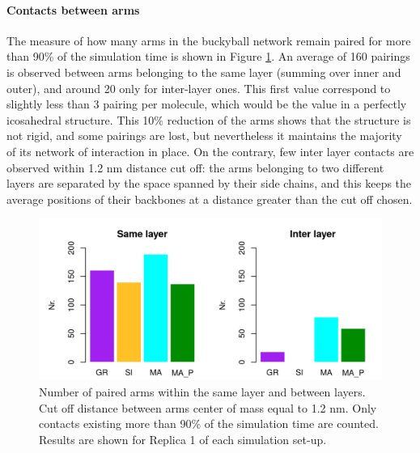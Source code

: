 \paragraph{Contacts between arms} The measure of how many arms in the buckyball network remain paired for more than 90\% of the simulation time is shown in Figure \ref{fig:BTI_beta}. An average of 160 pairings is observed between arms belonging to the same layer (summing over inner and outer), and around 20 only for inter-layer ones.
%
This first value correspond to slightly less than 3 pairing per molecule, which would be the value in a perfectly icosahedral structure. This 10\% reduction of the arms shows that the structure is not rigid, and some pairings are lost, but nevertheless it maintains the majority of its network of interaction in place.
%
On the contrary, few inter layer contacts are observed within 1.2 nm distance cut off: the arms belonging to two different layers are separated by the space spanned by their side chains, and this keeps the average positions of their backbones at a distance greater than the cut off chosen.
%
\begin{figure}[t!]
\centering
\includegraphics[width=0.85\linewidth]{3results_capsule/pics/stAll_beta_90_R1.png}
\caption[Arm pairing during simulations of the buckyball]{Number of paired arms within the same layer and between layers. Cut off distance between arms center of mass equal to 1.2 nm. Only contacts existing more than 90\% of the simulation time are counted. Results are shown for Replica 1 of each simulation set-up.}
\label{fig:BTI_beta}
\end{figure}

